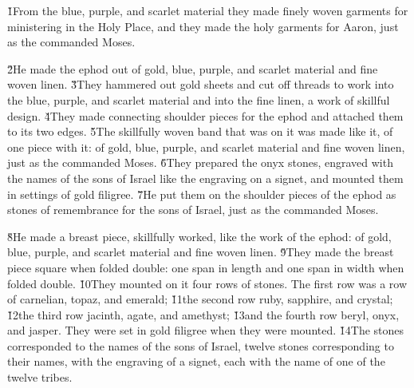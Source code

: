 \v{1}From the blue, purple, and scarlet material they made finely woven garments for ministering in the Holy Place, and they made the holy garments for Aaron, just as the  commanded Moses.

\v{2}He made the ephod out of gold, blue, purple, and scarlet material and fine woven linen. \v{3}They hammered out gold sheets and cut off threads to work into the blue, purple, and scarlet material and into the fine linen, a work of skillful design. \v{4}They made connecting shoulder pieces for the ephod and attached them to its two edges. \v{5}The skillfully woven band that was on it was made like it, of one piece with it: of gold, blue, purple, and scarlet material and fine woven linen, just as the  commanded Moses. \v{6}They prepared the onyx stones, engraved with the names of the sons of Israel like the engraving on a signet, and mounted them in settings of gold filigree. \v{7}He put them on the shoulder pieces of the ephod as stones of remembrance for the sons of Israel, just as the  commanded Moses.

\v{8}He made a breast piece, skillfully worked, like the work of the ephod: of gold, blue, purple, and scarlet material and fine woven linen. \v{9}They made the breast piece square when folded double: one span in length and one span in width when folded double. \v{10}They mounted on it four rows of stones. The first row was a row of carnelian, topaz, and emerald; \v{11}the second row ruby, sapphire, and crystal; \v{12}the third row jacinth, agate, and amethyst; \v{13}and the fourth row beryl, onyx, and jasper. They were set in gold filigree when they were mounted. \v{14}The stones corresponded to the names of the sons of Israel, twelve stones corresponding to their names, with the engraving of a signet, each with the name of one of the twelve tribes.

